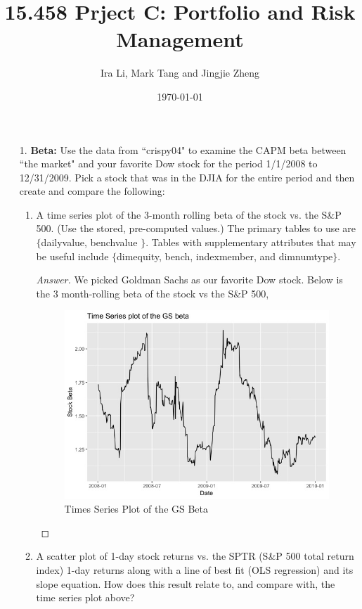 \documentclass[10pt]{article}
\title{15.458 Prject C: Portfolio and Risk Management}
\author{Ira Li, Mark Tang and Jingjie Zheng}
\date{\today}
\begin{document}
\maketitle

\begin{enumerate}
    \item[1.] \textbf{Beta:} Use the data from ``crispy04" to examine the CAPM beta between ``the market" and your favorite Dow stock for the period 1/1/2008 to 12/31/2009. Pick a stock that was in the DJIA for the entire period and then create and compare the following:
    \begin{enumerate}
        \item A time series plot of the 3-month rolling beta of the stock vs. the S\&P 500. (Use the stored, pre-computed values.) The primary tables to use are $\{$dailyvalue, benchvalue $\}$. Tables with supplementary attributes that may be useful include $\{$dim\textunderscore equity, bench, indexmember, and dim\textunderscore numtype$\}$.
        \begin{proof}[Answer] We picked Goldman Sachs as our favorite Dow stock. Below is the 3 month-rolling beta of the stock vs the S\&P 500,
        \begin{figure}[ht]
            \centering
            \includegraphics[scale = 0.45]{Q1a.jpeg}
            \caption{Times Series Plot of the GS Beta}
        \end{figure}
        \end{proof}
        
        
        
        
        \item A scatter plot of 1-day stock returns vs. the SPTR (S\&P 500 total return index) 1-day returns along with a line of best fit (OLS regression) and its slope equation. How does this result relate to, and compare with, the time series plot above?
        

\end{enumerate}
\end{enumerate}
\end{document}
